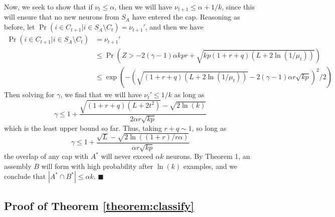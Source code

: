 \documentclass[final,12pt]{colt2022} %
\newcommand{\assmcore}[1]{{#1}^*}
\newcommand{\stimcore}[1]{S_{#1}}
\begin{document}
Now, we seek to show that if $\nu_t \leq \alpha$, then we will have $\nu_{t+1} \leq \alpha + 1/k$, since this will ensure that no new neurons from $\stimcore{A}$ have entered the cap. Reasoning as before, let $\Pr (i \in C_{t+1} | i \in \stimcore{A} \setminus C_t) = \nu_{t+1}'$, and then we have \begin{align*}
    \Pr (i \in C_{t+1} | i \in \stimcore{A} \setminus C_t) &= \nu_{t+1}'\\
    &\leq \Pr \left(Z > -2(\gamma - 1)\alpha kpr + \sqrt{kp(1+r+q)(L+2\ln(1/\mu_t))}\right)\\
    &\leq \exp\left(-\left(\sqrt{(1+r+q)(L+2\ln(1/\mu_t))} - 2(\gamma - 1)\alpha r\sqrt{kp}\right)^2/2 \right)
\end{align*} Then solving for $\gamma$, we find that we will have $\nu_t' \leq 1/k$ as long as \[\gamma \leq 1 + \frac{\sqrt{(1+r+q)(L+2t^2)} - \sqrt{2\ln(k)}}{2\alpha r\sqrt{kp}}\] which is the least upper bound so far. Thus, taking $r+q\sim 1$, so long as \[\gamma \leq 1 + \frac{\sqrt{L} - \sqrt{2\ln((1+r)/r\alpha)}}{\alpha r \sqrt{kp}}\] the overlap of any cap with $A^*$ will never exceed $\alpha k$ neurons. By Theorem 1, an assembly $B$ will form with high probability after $\ln(k)$ examples, and we conclude that $|\assmcore{A} \cap \assmcore{B}| \le \alpha k$.
\hfill$\blacksquare$

\subsection*{Proof of Theorem \ref{theorem:classify}} \label{appendix:classify}
\end{document}
